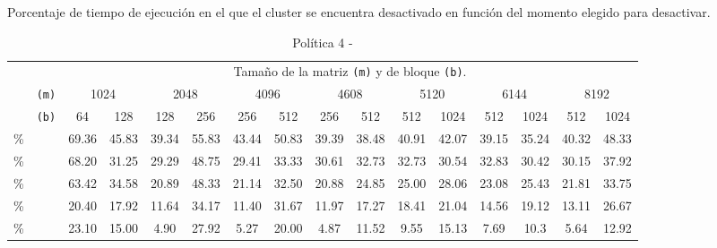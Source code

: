 \begin{table}
  \centering
  \caption{Porcentaje de tiempo de ejecución en el que el cluster se
    encuentra desactivado en función del momento elegido para desactivar.}
  \label{tab:tam-colas-tiempo}
  {\scriptsize
    \begin{tabular}{lccccccccccccccc}
      \toprule
      \multicolumn{2}{c}{\phantom{a}} & \multicolumn{14}{c}{Tamaño de la matriz \texttt{(m)} y
                                        de bloque \texttt{(b)}.} \\ \cmidrule{2-16}
      \phantom{4} & \texttt{(m)} & \multicolumn{2}{c}{1024} & \multicolumn{2}{c}{2048} &                                                                         \multicolumn{2}{c}{4096} & \multicolumn{2}{c}{4608} & \multicolumn{2}{c}{5120} & \multicolumn{2}{c}{6144} & \multicolumn{2}{c}{8192} \\
      \phantom{a} & \texttt{(b)} & 64 & 128 & 128 & 256 & 256 & 512 & 256 & 512 & 512 & 1024 & 512 & 1024 & 512 & 1024 \\ \hline

{\sc 50\%} & \phantom{a} &69.36 & 45.83 & 39.34 & 55.83 & 43.44 & 50.83 & 39.39 & 38.48 & 40.91 & 42.07 & 39.15 & 35.24 & 40.32 & 48.33 \\
{\sc 40\%} & \phantom{a} &68.20 & 31.25 & 29.29 & 48.75 & 29.41 & 33.33 & 30.61 & 32.73 & 32.73 & 30.54 & 32.83 & 30.42& 30.15 & 37.92 \\
{\sc 30\%} & \phantom{a} &63.42 & 34.58 & 20.89 & 48.33 & 21.14 & 32.50 & 20.88 & 24.85 & 25.00 & 28.06 & 23.08 & 25.43& 21.81 & 33.75 \\
{\sc 20\%} & \phantom{a} &20.40 & 17.92 & 11.64 & 34.17 & 11.40 & 31.67 & 11.97 & 17.27 & 18.41 & 21.04 & 14.56 & 19.12& 13.11 & 26.67 \\
{\sc 10\%} & \phantom{a} &23.10 & 15.00 & 4.90  & 27.92 & 5.27  & 20.00 & 4.87 & 11.52  & 9.55 & 15.13 &7.69 & 10.3 & 5.64 & 12.92 \\ \bottomrule
    \end{tabular}
    \caption*{Política 4 - \juno}
  }



\end{table}
